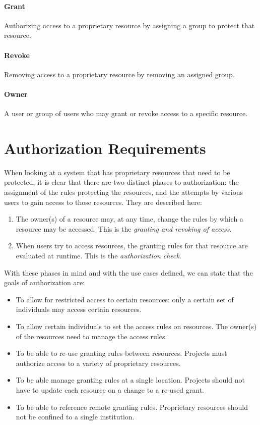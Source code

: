 \documentclass[11pt,a4paper]{ivoa}
\begin{document}
\paragraph{Grant} Authorizing access to a proprietary resource by assigning a group to protect that resource.

\paragraph{Revoke} Removing access to a proprietary resource by removing an assigned group.

\paragraph{Owner} A user or group of users who may grant or revoke access to a specific resource.

\section{Authorization Requirements}

When looking at a system that has proprietary resources that need to be protected, it is clear that there are two distinct phases to authorization:  the assignment of the rules protecting the resources, and the attempts by various users to gain access to those resources.  They are described here:

\begin{enumerate}
\item The owner(s) of a resource may, at any time, change the rules by which a resource may be accessed. This is the \emph{granting and revoking of access}.
\item When users try to access resources, the granting rules for that resource are evaluated at runtime. This is the \emph{authorization check}.
\end{enumerate}

With these phases in mind and with the use cases defined, we can state that the goals of authorization are:

\begin{itemize}
\item To allow for restricted access to certain resources: only a certain set of individuals may access certain resources.
\item To allow certain individuals to set the access rules on resources.  The owner(s) of the resources need to manage the access rules.
\item To be able to re-use granting rules between resources.  Projects must authorize access to a variety of proprietary resources.
\item To be able manage granting rules at a single location.  Projects should not have to update each resource on a change to a re-used grant.
\item To be able to reference remote granting rules.  Proprietary resources should not be confined to a single institution.
\end{itemize}
\end{document}
